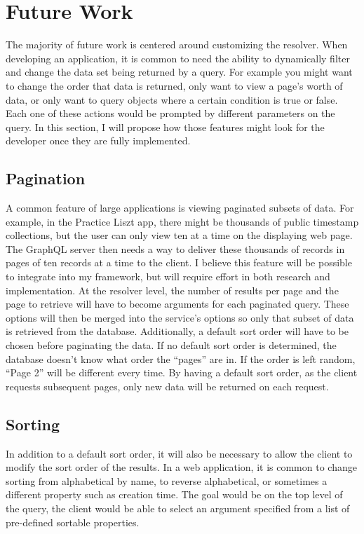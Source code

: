 \section{Future Work}

The majority of future work is centered around customizing the resolver.  When developing an application, it is common to need the ability to dynamically filter and change the data set being returned by a query.  For example you might want to change the order that data is returned, only want to view a page's worth of data, or only want to query objects where a certain condition is true or false.  Each one of these actions would be prompted by different parameters on the query.  In this section, I will propose how those features might look for the developer once they are fully implemented.

\subsection{Pagination}

A common feature of large applications is viewing paginated subsets of data.  For example, in the Practice Liszt app, there might be thousands of public timestamp collections, but the user can only view ten at a time on the displaying web page.  The GraphQL server then needs a way to deliver these thousands of records in pages of ten records at a time to the client.  I believe this feature will be possible to integrate into my framework, but will require effort in both research and implementation.  At the resolver level, the number of results per page and the page to retrieve will have to become arguments for each paginated query. These options will then be merged into the service's options so only that subset of data is retrieved from the database.  Additionally, a default sort order will have to be chosen before paginating the data.  If no default sort order is determined, the database doesn't know what order the ``pages'' are in.  If the order is left random, ``Page 2'' will be different every time.  By having a default sort order, as the client requests subsequent pages, only new data will be returned on each request.

\subsection{Sorting}

In addition to a default sort order, it will also be necessary to allow the client to modify the sort order of the results.  In a web application, it is common to change sorting from alphabetical by name, to reverse alphabetical, or sometimes a different property such as creation time.  The goal would be on the top level of the query, the client would be able to select an argument specified from a list of pre-defined sortable properties.

